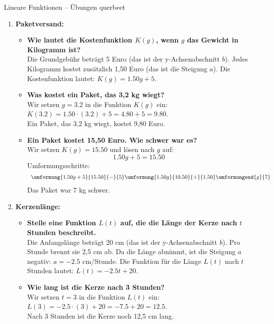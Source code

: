 \begin{loesungsumgebung}{Lineare Funktionen – Übungen querbeet}

\begin{enumerate}
    \item \textbf{Paketversand:}
    \begin{itemize}
        \item \textbf{Wie lautet die Kostenfunktion $K(g)$, wenn $g$ das Gewicht in Kilogramm ist?} \\
        Die Grundgebühr beträgt 5 Euro (das ist der y-Achsenabschnitt $b$).
        Jedes Kilogramm kostet zusätzlich 1,50 Euro (das ist die Steigung $a$).
        Die Kostenfunktion lautet: $K(g) = 1.50g + 5$.

        \item \textbf{Was kostet ein Paket, das 3,2 kg wiegt?} \\
        Wir setzen $g = 3.2$ in die Funktion $K(g)$ ein:
        $K(3.2) = 1.50 \cdot (3.2) + 5 = 4.80 + 5 = 9.80$. \\
        Ein Paket, das 3,2 kg wiegt, kostet 9,80 Euro.

        \item \textbf{Ein Paket kostet 15,50 Euro. Wie schwer war es?} \\
        Wir setzen $K(g) = 15.50$ und lösen nach $g$ auf:
        $$ 1.50g + 5 = 15.50 $$
        Umformungsschritte:
        $$
        \begin{array}{r c l c l}
        \umformung{1.50g + 5}{15.50}{-}{5}
        \umformung{1.50g}{10.50}{\div}{1.50}
        \umformungend{g}{7}
        \end{array}
        $$
        Das Paket war 7 kg schwer.
    \end{itemize}

    \item \textbf{Kerzenlänge:}
    \begin{itemize}
        \item \textbf{Stelle eine Funktion $L(t)$ auf, die die Länge der Kerze nach $t$ Stunden beschreibt.} \\
        Die Anfangslänge beträgt 20 cm (das ist der y-Achsenabschnitt $b$).
        Pro Stunde brennt sie 2,5 cm ab. Da die Länge abnimmt, ist die Steigung $a$ negativ: $a = -2.5$ cm/Stunde.
        Die Funktion für die Länge $L(t)$ nach $t$ Stunden lautet: $L(t) = -2.5t + 20$.

        \item \textbf{Wie lang ist die Kerze nach 3 Stunden?} \\
        Wir setzen $t = 3$ in die Funktion $L(t)$ ein:
        $L(3) = -2.5 \cdot (3) + 20 = -7.5 + 20 = 12.5$. \\
        Nach 3 Stunden ist die Kerze noch 12,5 cm lang.


\end{itemize}
\end{enumerate}
\end{loesungsumgebung}
